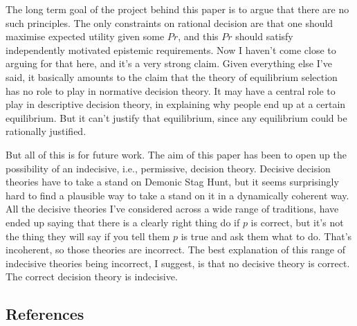\documentclass[
  12pt,
]{article}
\begin{document}
The long term goal of the project behind this paper is to argue that
there are no such principles. The only constraints on rational decision
are that one should maximise expected utility given some \(Pr\), and
this \(Pr\) should satisfy independently motivated epistemic
requirements. Now I haven't come close to arguing for that here, and
it's a very strong claim. Given everything else I've said, it basically
amounts to the claim that the theory of equilibrium selection has no
role to play in normative decision theory. It may have a central role to
play in descriptive decision theory, in explaining why people end up at
a certain equilibrium. But it can't justify that equilibrium, since any
equilibrium could be rationally justified.

But all of this is for future work. The aim of this paper has been to
open up the possibility of an indecisive, i.e., permissive, decision
theory. Decisive decision theories have to take a stand on Demonic Stag
Hunt, but it seems surprisingly hard to find a plausible way to take a
stand on it in a dynamically coherent way. All the decisive theories
I've considered across a wide range of traditions, have ended up saying
that there is a clearly right thing do if \(p\) is correct, but it's not
the thing they will say if you tell them \(p\) is true and ask them what
to do. That's incoherent, so those theories are incorrect. The best
explanation of this range of indecisive theories being incorrect, I
suggest, is that no decisive theory is correct. The correct decision
theory is indecisive.

\newpage

\hypertarget{references}{%
\subsection*{References}\label{references}}
\end{document}
